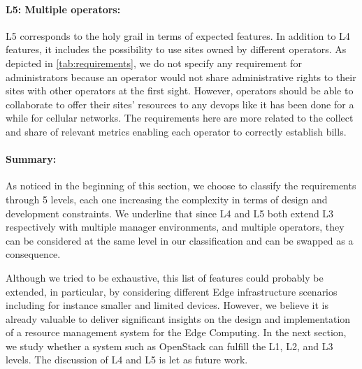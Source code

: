 \paragraph{L5: Multiple operators:}
L5 corresponds to the holy grail in terms of expected features. In
addition to L4 features, it includes the possibility to use sites
owned by different operators. As depicted in \cref{tab:requirements},
we do not specify any requirement for administrators because an
operator would not share administrative rights to their sites with
other operators at the first sight. However, operators should be able
to collaborate to offer their sites' resources to any devops like it has
been done for a while for cellular networks. The requirements here are more
related to the collect and share of relevant metrics enabling each operator to
correctly establish bills.

\paragraph{Summary:}
As noticed in the beginning of this section, we choose to classify the
requirements through 5 levels, each one increasing the complexity in
terms of design and development constraints. We underline that since
L4 and L5 both extend L3 respectively with multiple manager
environments, and multiple operators, they can be considered at the
same level in our classification and can be swapped as a consequence.

Although we tried to be exhaustive, this list of features could
probably be extended, in particular, by considering different Edge
infrastructure scenarios including for instance smaller and limited devices.
However, we believe it is already valuable to deliver significant
insights on the design and implementation of a resource management
system for the Edge Computing. In the next section, we study whether a
system such as OpenStack can fulfill the L1, L2, and L3 levels.
The discussion of L4 and L5 is let as future work.


